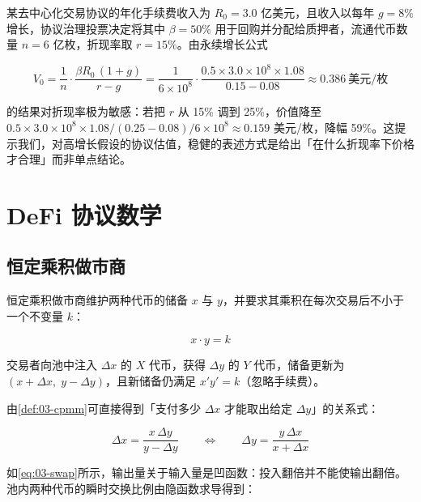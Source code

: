 \begin{example}[用协议现金流估算代币价值]\label{ex:03-dcf}
某去中心化交易协议的年化手续费收入为 $R_0 = 3.0$ 亿美元，且收入以每年 $g = 8\%$ 增长，协议治理投票决定将其中 $\beta = 50\%$ 用于回购并分配给质押者，流通代币数量 $n = 6$ 亿枚，折现率取 $r = 15\%$。由永续增长公式

\[
  V_0 = \frac{1}{n}\cdot\frac{\beta R_0\,(1+g)}{r-g}
      = \frac{1}{6\times 10^{8}}\cdot\frac{0.5\times 3.0\times 10^{8}\times 1.08}{0.15-0.08}
      \approx 0.386\ \text{美元/枚}
\]
\end{example}

的结果对折现率极为敏感：若把 $r$ 从 15\% 调到 25\%，价值降至 $0.5\times3.0\times10^{8}\times1.08/(0.25-0.08)/6\times10^{8}\approx 0.159$ 美元/枚，降幅 59\%。这提示我们，对高增长假设的协议估值，稳健的表述方式是给出「在什么折现率下价格才合理」而非单点结论。

\section{DeFi 协议数学}

\subsection{恒定乘积做市商}

\begin{definition}\label{def:03-cpmm}
恒定乘积做市商维护两种代币的储备 $x$ 与 $y$，并要求其乘积在每次交易后不小于一个不变量 $k$：

\begin{equation}
  x\cdot y = k
  \label{eq:03-cpmm}
\end{equation}

交易者向池中注入 $\Delta x$ 的 $X$ 代币，获得 $\Delta y$ 的 $Y$ 代币，储备更新为 $(x+\Delta x,\;y-\Delta y)$，且新储备仍满足 $x'y'=k$（忽略手续费）。
\end{definition}

由\cref{def:03-cpmm}可直接得到「支付多少 $\Delta x$ 才能取出给定 $\Delta y$」的关系式：

\begin{equation}
  \Delta x = \frac{x\,\Delta y}{y-\Delta y}
  \qquad\Longleftrightarrow\qquad
  \Delta y = \frac{y\,\Delta x}{x+\Delta x}
  \label{eq:03-swap}
\end{equation}

如\cref{eq:03-swap}所示，输出量关于输入量是凹函数：投入翻倍并不能使输出翻倍。池内两种代币的瞬时交换比例由隐函数求导得到：

